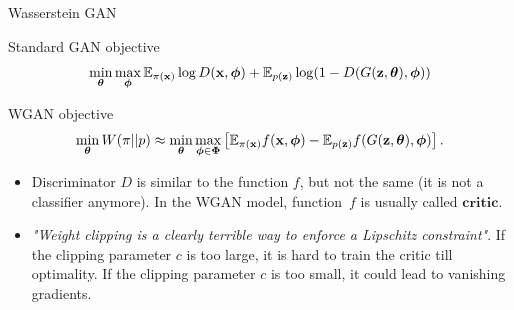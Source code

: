 \begin{frame}{Wasserstein GAN}
	\begin{block}{Standard GAN objective}
		\vspace{-0.2cm}
		\[
		\min_{\boldsymbol{\theta}} \max_{\boldsymbol{\phi}} \mathbb{E}_{\pi(\mathbf{x})} \log D(\mathbf{x}, \boldsymbol{\phi}) + \mathbb{E}_{p(\mathbf{z})} \log (1 - D(G(\mathbf{z}, \boldsymbol{\theta}), \boldsymbol{\phi}))
		\]
		\vspace{-0.2cm}
	\end{block}
	\begin{block}{WGAN objective}
		\vspace{-0.6cm}
		\[
		\min_{\boldsymbol{\theta}} W(\pi || p) \approx \min_{\boldsymbol{\theta}} \max_{\boldsymbol{\phi} \in \boldsymbol{\Phi}} \left[ \mathbb{E}_{\pi(\mathbf{x})} f(\mathbf{x}, \boldsymbol{\phi})  - \mathbb{E}_{p(\mathbf{z})} f(G(\mathbf{z}, \boldsymbol{\theta}), \boldsymbol{\phi} )\right].
		\]
		\vspace{-0.3cm}
	\end{block}
	\begin{itemize}
		\item Discriminator $D$ is similar to the function $f$, but not the same (it is not a classifier anymore). In the WGAN model, function~$f$ is usually called $\textbf{critic}$.
		\item \textit{"Weight clipping is a clearly terrible way to enforce a Lipschitz constraint"}. If the clipping parameter $c$ is too large, it is hard to train the critic till optimality. If the clipping parameter $c$ is too small, it could lead to vanishing gradients.
	\end{itemize}
	
\end{frame}
